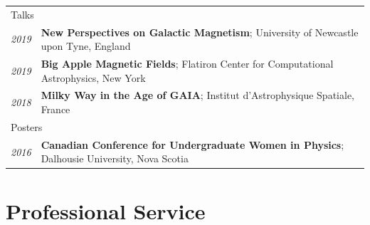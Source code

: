 \documentclass[10pt]{res} %
\begin{document}
\begin{resume}
\begin{table}[h!]
\begin{tabularx}{\textwidth}{lX}
\multicolumn{2}{l}{ \rule{0pt}{3ex} \large \hspace{-12pt} Talks \dotfill \rule[-1.2ex]{0pt}{0pt}} \\
\textit{2019} & \textbf{New Perspectives on Galactic Magnetism}; University of Newcastle upon Tyne, England \\
\textit{2019} & \textbf{Big Apple Magnetic Fields}; Flatiron Center for Computational Astrophysics, New York \\
\textit{2018} & \textbf{Milky Way in the Age of GAIA}; Institut d'Astrophysique Spatiale, France \\
\multicolumn{2}{l}{ \rule{0pt}{3ex} \large \hspace{-12pt} Posters \dotfill \rule[-1.2ex]{0pt}{0pt}}  \\
\textit{2016} & \textbf{Canadian Conference for Undergraduate Women in Physics}; Dalhousie University, Nova Scotia
\end{tabularx}
\end{table}


\section{\Large Professional Service}
\vspace{-5pt} %
\noindent\makebox[\linewidth]{\rule{\textwidth}{0.4pt}}
\vspace{-20pt} %


\end{resume}
\end{document}
